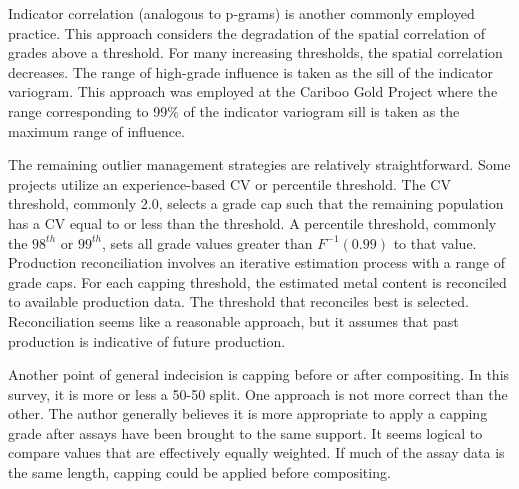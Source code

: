 
Indicator correlation (analogous to p-grams) is another commonly employed practice. This approach considers the degradation of the spatial correlation of grades above a threshold. For many increasing thresholds, the spatial correlation decreases. The range of high-grade influence is taken as the sill of the indicator variogram. This approach was employed at the Cariboo Gold Project \citep{osiko2020} where the range corresponding to 99\% of the indicator variogram sill is taken as the maximum range of influence.


The remaining outlier management strategies are relatively straightforward. Some projects utilize an experience-based \gls{CV} or percentile threshold. The \gls{CV} threshold, commonly 2.0, selects a grade cap such that the remaining population has a \gls{CV} equal to or less than the threshold. A percentile threshold, commonly the $98^{th}$ or $99^{th}$, sets all grade values greater than $F^{-1}(0.99)$ to that value. Production reconciliation involves an iterative estimation process with a range of grade caps. For each capping threshold, the estimated metal content is reconciled to available production data. The threshold that reconciles best is selected. Reconciliation seems like a reasonable approach, but it assumes that past production is indicative of future production.

Another point of general indecision is capping before or after compositing. In this survey, it is more or less a 50-50 split. One approach is not more correct than the other. The author generally believes it is more appropriate to apply a capping grade after assays have been brought to the same support. It seems logical to compare values that are effectively equally weighted. If much of the assay data is the same length, capping could be applied before compositing.


